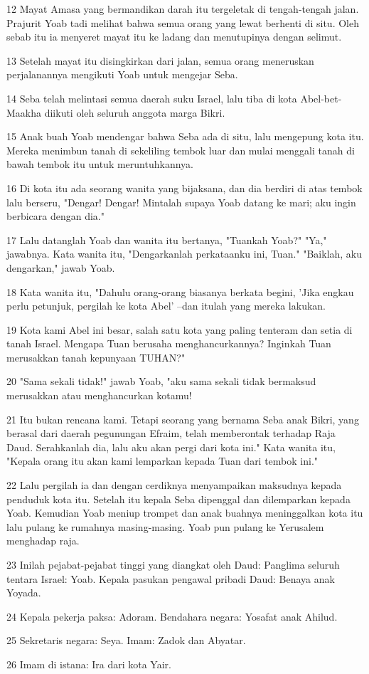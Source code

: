 \par 12 Mayat Amasa yang bermandikan darah itu tergeletak di tengah-tengah jalan. Prajurit Yoab tadi melihat bahwa semua orang yang lewat berhenti di situ. Oleh sebab itu ia menyeret mayat itu ke ladang dan menutupinya dengan selimut.
\par 13 Setelah mayat itu disingkirkan dari jalan, semua orang meneruskan perjalanannya mengikuti Yoab untuk mengejar Seba.
\par 14 Seba telah melintasi semua daerah suku Israel, lalu tiba di kota Abel-bet-Maakha diikuti oleh seluruh anggota marga Bikri.
\par 15 Anak buah Yoab mendengar bahwa Seba ada di situ, lalu mengepung kota itu. Mereka menimbun tanah di sekeliling tembok luar dan mulai menggali tanah di bawah tembok itu untuk meruntuhkannya.
\par 16 Di kota itu ada seorang wanita yang bijaksana, dan dia berdiri di atas tembok lalu berseru, "Dengar! Dengar! Mintalah supaya Yoab datang ke mari; aku ingin berbicara dengan dia."
\par 17 Lalu datanglah Yoab dan wanita itu bertanya, "Tuankah Yoab?" "Ya," jawabnya. Kata wanita itu, "Dengarkanlah perkataanku ini, Tuan." "Baiklah, aku dengarkan," jawab Yoab.
\par 18 Kata wanita itu, "Dahulu orang-orang biasanya berkata begini, 'Jika engkau perlu petunjuk, pergilah ke kota Abel' --dan itulah yang mereka lakukan.
\par 19 Kota kami Abel ini besar, salah satu kota yang paling tenteram dan setia di tanah Israel. Mengapa Tuan berusaha menghancurkannya? Inginkah Tuan merusakkan tanah kepunyaan TUHAN?"
\par 20 "Sama sekali tidak!" jawab Yoab, "aku sama sekali tidak bermaksud merusakkan atau menghancurkan kotamu!
\par 21 Itu bukan rencana kami. Tetapi seorang yang bernama Seba anak Bikri, yang berasal dari daerah pegunungan Efraim, telah memberontak terhadap Raja Daud. Serahkanlah dia, lalu aku akan pergi dari kota ini." Kata wanita itu, "Kepala orang itu akan kami lemparkan kepada Tuan dari tembok ini."
\par 22 Lalu pergilah ia dan dengan cerdiknya menyampaikan maksudnya kepada penduduk kota itu. Setelah itu kepala Seba dipenggal dan dilemparkan kepada Yoab. Kemudian Yoab meniup trompet dan anak buahnya meninggalkan kota itu lalu pulang ke rumahnya masing-masing. Yoab pun pulang ke Yerusalem menghadap raja.
\par 23 Inilah pejabat-pejabat tinggi yang diangkat oleh Daud: Panglima seluruh tentara Israel: Yoab. Kepala pasukan pengawal pribadi Daud: Benaya anak Yoyada.
\par 24 Kepala pekerja paksa: Adoram. Bendahara negara: Yosafat anak Ahilud.
\par 25 Sekretaris negara: Seya. Imam: Zadok dan Abyatar.
\par 26 Imam di istana: Ira dari kota Yair.

